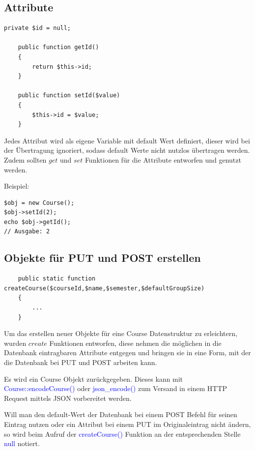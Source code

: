 \documentclass[10pt,a4paper,final,parskip]{scrartcl}
\newcommand{\blau}[1]{\textcolor{blue}{#1}}
\begin{document}
\subsection{Attribute}
\begin{minipage}{\textwidth}
\begin{lstlisting}
private $id = null;

    public function getId()
    {
        return $this->id;
    }
    
    public function setId($value)
    {
        $this->id = $value;
    }
\end{lstlisting}
\end{minipage}

Jedes Attribut wird als eigene Variable mit default Wert definiert, dieser wird bei der Übertragung ignoriert, sodass default Werte nicht nutzlos übertragen werden. Zudem sollten $get$ und $set$ Funktionen für die Attribute entworfen und genutzt werden.

\begin{minipage}{\textwidth}
Beispiel:
\begin{lstlisting}
$obj = new Course();
$obj->setId(2);
echo $obj->getId();
// Ausgabe: 2
\end{lstlisting}
\end{minipage}

\subsection{Objekte für PUT und POST erstellen}
\begin{minipage}{\textwidth}
\begin{lstlisting}
    public static function createCourse($courseId,$name,$semester,$defaultGroupSize)
    {
    	...
    }
\end{lstlisting}
\end{minipage}

Um das erstellen neuer Objekte für eine Course Datenstruktur zu erleichtern, wurden $create$ Funktionen entworfen, diese nehmen die möglichen in die Datenbank eintragbaren Attribute entgegen und bringen sie in eine Form, mit der die Datenbank bei PUT und POST arbeiten kann.

Es wird ein Course Objekt zurückgegeben. Dieses kann mit \textcolor{blue}{Course::encodeCourse()} oder \textcolor{blue}{json\_encode()} zum Versand in einem HTTP Request mittels JSON vorbereitet werden.

Will man den default-Wert der Datenbank bei einem POST Befehl für seinen Eintrag nutzen oder ein Attribut bei einem PUT im Originaleintrag nicht ändern, so wird beim Aufruf der \blau{createCourse()} Funktion an der entsprechenden Stelle \blau{null} notiert. 
\end{document}
